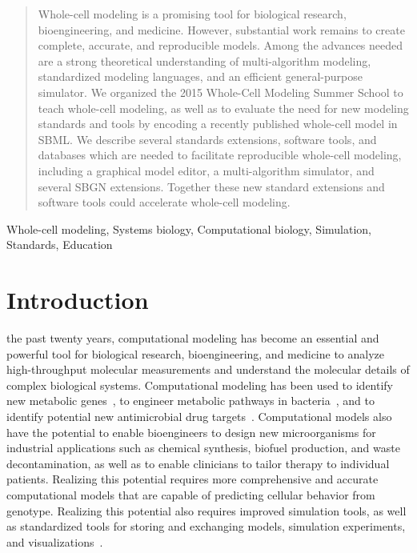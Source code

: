 \documentclass[journal,transmag]{IEEEtran}
\begin{document}
\begin{abstract}
Whole-cell modeling is a promising tool for biological research, bioengineering, and medicine. 
However, substantial work remains to create complete, accurate, and reproducible models.
Among the advances needed are a strong theoretical understanding of multi-algorithm modeling, standardized modeling languages, and an efficient general-purpose simulator.
We organized the 2015 Whole-Cell Modeling Summer School to teach whole-cell modeling, as well as to evaluate the need for new modeling standards and tools by encoding a recently published whole-cell model in SBML.
We describe several standards extensions, software tools, and databases which are needed to facilitate reproducible whole-cell modeling, including a graphical model editor, a multi-algorithm simulator, and several SBGN extensions.
Together these new standard extensions and software tools could accelerate whole-cell modeling.
\end{abstract}

\begin{IEEEkeywords}
Whole-cell modeling, Systems biology, Computational biology, Simulation, Standards, Education
\end{IEEEkeywords}

\IEEEpeerreviewmaketitle

\section{Introduction}

 the past twenty years, computational modeling has become an essential and powerful tool for biological research, bioengineering, and medicine to analyze high-throughput molecular measurements and understand the molecular details of complex biological systems. Computational modeling has been used to identify new metabolic genes~\cite{Reed2006}, to engineer metabolic pathways in bacteria~\cite{Lee2012}, and to identify potential new antimicrobial drug targets~\cite{Lee2009}.
Computational models also have the potential to enable bioengineers to design new microorganisms for industrial applications such as chemical synthesis, biofuel production, and waste decontamination, as well as to enable clinicians to tailor therapy to individual patients. Realizing this potential requires more comprehensive and accurate computational models that are capable of predicting cellular behavior from genotype. Realizing this potential also requires improved simulation tools, as well as standardized tools for storing and exchanging models, simulation experiments, and visualizations~\cite{Macklin2014,Karr2015,Karr2015b,hucka2015promoting,Klipp07,path2models2013}.
\end{document}

